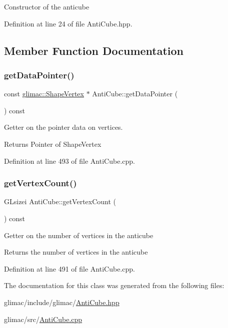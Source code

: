 Constructor of the anticube 

Definition at line 24 of file Anti\+Cube.\+hpp.



\subsection{Member Function Documentation}
\mbox{\label{class_anti_cube_a0e351dacff6b083fd5790b7d5e2d76bc}} 
\subsubsection{\texorpdfstring{get\+Data\+Pointer()}{getDataPointer()}}
{\footnotesize\ttfamily const \hyperlink{structglimac_1_1_shape_vertex}{glimac\+::\+Shape\+Vertex} $\ast$ Anti\+Cube\+::get\+Data\+Pointer (\begin{DoxyParamCaption}{ }\end{DoxyParamCaption}) const}

Getter on the pointer data on vertices. \begin{DoxyReturn}{Returns}
Pointer of Shape\+Vertex 
\end{DoxyReturn}


Definition at line 493 of file Anti\+Cube.\+cpp.

\mbox{\label{class_anti_cube_aebdbeff8a01e37b90d448afe0a341b85}} 
\subsubsection{\texorpdfstring{get\+Vertex\+Count()}{getVertexCount()}}
{\footnotesize\ttfamily G\+Lsizei Anti\+Cube\+::get\+Vertex\+Count (\begin{DoxyParamCaption}{ }\end{DoxyParamCaption}) const}

Getter on the number of vertices in the anticube \begin{DoxyReturn}{Returns}
the number of vertices in the anticube 
\end{DoxyReturn}


Definition at line 491 of file Anti\+Cube.\+cpp.



The documentation for this class was generated from the following files\+:\begin{DoxyCompactItemize}
\item 
glimac/include/glimac/\hyperlink{_anti_cube_8hpp}{Anti\+Cube.\+hpp}\item 
glimac/src/\hyperlink{_anti_cube_8cpp}{Anti\+Cube.\+cpp}\end{DoxyCompactItemize}
